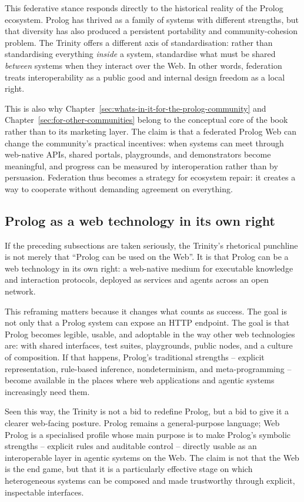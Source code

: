 This federative stance responds directly to the historical reality of the Prolog ecosystem. Prolog has thrived as a family of systems with different strengths, but that diversity has also produced a persistent portability and community-cohesion problem. The Trinity offers a different axis of standardisation: rather than standardising everything \emph{inside} a system, standardise what must be shared \emph{between} systems when they interact over the Web. In other words, federation treats interoperability as a public good and internal design freedom as a local right.

This is also why Chapter~\ref{sec:whats-in-it-for-the-prolog-community} and Chapter~\ref{sec:for-other-communities} belong to the conceptual core of the book rather than to its marketing layer. The claim is that a federated Prolog Web can change the community's practical incentives: when systems can meet through web-native APIs, shared portals, playgrounds, and demonstrators become meaningful, and progress can be measured by interoperation rather than by persuasion. Federation thus becomes a strategy for ecosystem repair: it creates a way to cooperate without demanding agreement on everything.

\subsection{Prolog as a web technology in its own right}\label{sec:vision-prolog-as-web-tech}
If the preceding subsections are taken seriously, the Trinity's rhetorical punchline is not merely that ``Prolog can be used on the Web''. It is that Prolog can be a web technology in its own right: a web-native medium for executable knowledge and interaction protocols, deployed as services and agents across an open network.

This reframing matters because it changes what counts as success. The goal is not only that a Prolog system can expose an HTTP endpoint. The goal is that Prolog becomes legible, usable, and adoptable in the way other web technologies are: with shared interfaces, test suites, playgrounds, public nodes, and a culture of composition. If that happens, Prolog's traditional strengths -- explicit representation, rule-based inference, nondeterminism, and meta-programming -- become available in the places where web applications and agentic systems increasingly need them.

Seen this way, the Trinity is not a bid to redefine Prolog, but a bid to give it a clearer web-facing posture. Prolog remains a general-purpose language; Web Prolog is a specialised profile whose main purpose is to make Prolog's symbolic strengths -- explicit rules and auditable control -- directly usable as an interoperable layer in agentic systems on the Web. The claim is not that the Web is the end game, but that it is a particularly effective stage on which heterogeneous systems can be composed and made trustworthy through explicit, inspectable interfaces.

